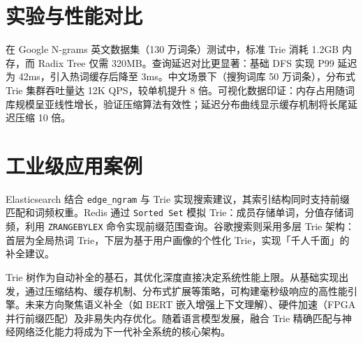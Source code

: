 \chapter{实验与性能对比}
在 Google N-grams 英文数据集（130 万词条）测试中，标准 Trie 消耗 1.2GB 内存，而 Radix Tree 仅需 320MB。查询延迟对比更显著：基础 DFS 实现 P99 延迟为 42ms，引入热词缓存后降至 3ms。中文场景下（搜狗词库 50 万词条），分布式 Trie 集群吞吐量达 12K QPS，较单机提升 8 倍。可视化数据印证：内存占用随词库规模呈亚线性增长，验证压缩算法有效性；延迟分布曲线显示缓存机制将长尾延迟压缩 10 倍。\par
\chapter{工业级应用案例}
Elasticsearch 结合 \texttt{edge\_{}ngram} 与 Trie 实现搜索建议，其索引结构同时支持前缀匹配和词频权重。Redis 通过 \texttt{Sorted Set} 模拟 Trie：成员存储单词，分值存储词频，利用 \texttt{ZRANGEBYLEX} 命令实现前缀范围查询。谷歌搜索则采用多层 Trie 架构：首层为全局热词 Trie，下层为基于用户画像的个性化 Trie，实现「千人千面」的补全建议。\par
Trie 树作为自动补全的基石，其优化深度直接决定系统性能上限。从基础实现出发，通过压缩结构、缓存机制、分布式扩展等策略，可构建毫秒级响应的高性能引擎。未来方向聚焦语义补全（如 BERT 嵌入增强上下文理解）、硬件加速（FPGA 并行前缀匹配）及非易失内存优化。随着语言模型发展，融合 Trie 精确匹配与神经网络泛化能力将成为下一代补全系统的核心架构。\par
